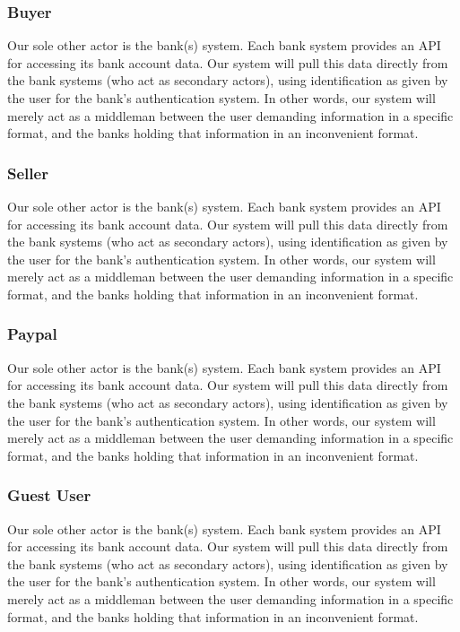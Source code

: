 \documentclass[11pt]{article}
\newcounter{use case ID}
\begin{document}
\subsubsection{Buyer}
Our sole other actor is the bank(s) system. Each bank system provides an API for accessing its bank account data. Our system will pull this data directly from the bank systems (who act as secondary actors), using identification as given by the user for the bank's authentication system. In other words, our system will merely act as a middleman between the user demanding information in a specific format, and the banks holding that information in an inconvenient format.
\subsubsection{Seller}
Our sole other actor is the bank(s) system. Each bank system provides an API for accessing its bank account data. Our system will pull this data directly from the bank systems (who act as secondary actors), using identification as given by the user for the bank's authentication system. In other words, our system will merely act as a middleman between the user demanding information in a specific format, and the banks holding that information in an inconvenient format.
\subsubsection{Paypal}
Our sole other actor is the bank(s) system. Each bank system provides an API for accessing its bank account data. Our system will pull this data directly from the bank systems (who act as secondary actors), using identification as given by the user for the bank's authentication system. In other words, our system will merely act as a middleman between the user demanding information in a specific format, and the banks holding that information in an inconvenient format.
\subsubsection{Guest User}
Our sole other actor is the bank(s) system. Each bank system provides an API for accessing its bank account data. Our system will pull this data directly from the bank systems (who act as secondary actors), using identification as given by the user for the bank's authentication system. In other words, our system will merely act as a middleman between the user demanding information in a specific format, and the banks holding that information in an inconvenient format.
\end{document}
